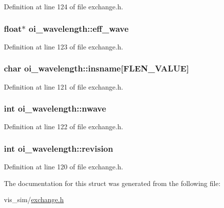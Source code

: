 Definition at line 124 of file exchange.h.

\hypertarget{structoi__wavelength_a42f864640bef01df797a93df3b83b269}{
\subsubsection[{eff\_\-wave}]{\setlength{\rightskip}{0pt plus 5cm}float$\ast$ {\bf oi\_\-wavelength::eff\_\-wave}}}
\label{structoi__wavelength_a42f864640bef01df797a93df3b83b269}


Definition at line 123 of file exchange.h.

\hypertarget{structoi__wavelength_abb40f6cfe8257b0f2193c62cb29782e5}{
\subsubsection[{insname}]{\setlength{\rightskip}{0pt plus 5cm}char {\bf oi\_\-wavelength::insname}\mbox{[}FLEN\_\-VALUE\mbox{]}}}
\label{structoi__wavelength_abb40f6cfe8257b0f2193c62cb29782e5}


Definition at line 121 of file exchange.h.

\hypertarget{structoi__wavelength_aca523aaa717b16de29f32c88705d0803}{
\subsubsection[{nwave}]{\setlength{\rightskip}{0pt plus 5cm}int {\bf oi\_\-wavelength::nwave}}}
\label{structoi__wavelength_aca523aaa717b16de29f32c88705d0803}


Definition at line 122 of file exchange.h.

\hypertarget{structoi__wavelength_ab1a73161490a72249b8afefb231fcc85}{
\subsubsection[{revision}]{\setlength{\rightskip}{0pt plus 5cm}int {\bf oi\_\-wavelength::revision}}}
\label{structoi__wavelength_ab1a73161490a72249b8afefb231fcc85}


Definition at line 120 of file exchange.h.



The documentation for this struct was generated from the following file:\begin{DoxyCompactItemize}
\item 
vis\_\-sim/\hyperlink{exchange_8h}{exchange.h}\end{DoxyCompactItemize}
